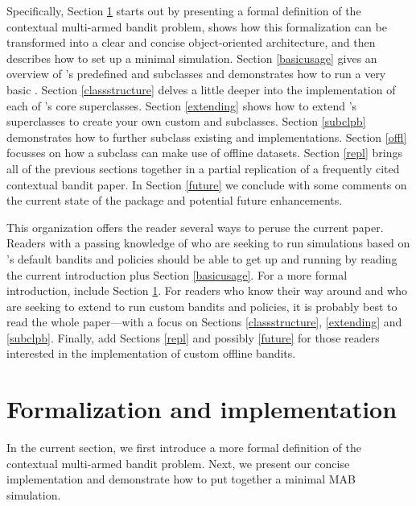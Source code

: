 \documentclass{jss}
\begin{document}
Specifically, Section \ref{formalizationandimplementation} starts out by presenting a formal definition of the contextual multi-armed bandit problem, shows how this formalization can be transformed into a clear and concise object-oriented architecture, and then describes how to set up a minimal simulation. Section \ref{basicusage} gives an overview of 's predefined  and  subclasses and demonstrates how to run a very basic . Section \ref{classstructure} delves a little deeper into the implementation of each of 's core superclasses. Section \ref{extending} shows how to extend 's superclasses to create your own custom  and  subclasses. Section \ref{subclpb} demonstrates how to further subclass existing  and  implementations. Section \ref{offl} focusses on how a  subclass can make use of offline datasets. Section \ref{repl} brings all of the previous sections together in a partial replication of a frequently cited contextual bandit paper. In Section \ref{future} we conclude with some comments on the current state of the package and potential future enhancements.

This organization offers the reader several ways to peruse the current paper. Readers with a passing knowledge of  who are seeking to run simulations based on 's default bandits and policies should be able to get up and running by reading the current introduction plus Section \ref{basicusage}. For a more formal introduction, include Section \ref{formalizationandimplementation}. For readers who know their way around  and who are seeking to extend  to run custom bandits and policies, it is probably best to read the whole paper---with a focus on Sections \ref{classstructure}, \ref{extending} and \ref{subclpb}. Finally, add Sections \ref{repl} and possibly \ref{future} for those readers interested in the implementation of custom offline bandits.

\section{Formalization and implementation} \label{formalizationandimplementation}

In the current section, we first introduce a more formal definition of the contextual multi-armed bandit problem. Next, we present our concise implementation and demonstrate how to put together a minimal MAB simulation.
\end{document}
